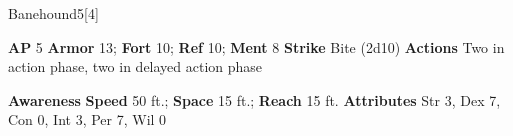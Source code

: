 \begin{monsection}{Banehound}{5}[4]
\vspace{-1em}\vspace{-1em}
\begin{spellcontent}
\begin{spelltargetinginfo}
{\textbf{AP} 5}
\pari \textbf{Armor} 13;
\textbf{Fort} 10;
\textbf{Ref} 10;
\textbf{Ment} 8
\pari \textbf{Strike} Bite  (2d10)
\pari \textbf{Actions} Two in action phase, two in delayed action phase
\end{spelltargetinginfo}
\end{spellcontent}
\begin{spellsubcontent}
\begin{spellfooter}
\pari \textbf{Awareness} 
\pari \textbf{Speed} 50 ft.;
\textbf{Space} 15 ft.;
\textbf{Reach} 15 ft.
\pari \textbf{Attributes}
Str 3,
Dex 7,
Con 0,
Int 3,
Per 7,
Wil 0
\end{spellfooter}
\end{spellsubcontent}
\end{monsection}
